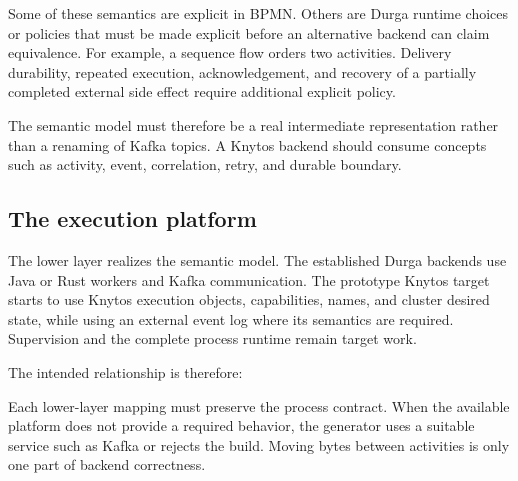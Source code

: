 Some of these semantics are explicit in BPMN. Others are Durga runtime choices
or policies that must be made explicit before an alternative backend can claim
equivalence. For example, a sequence flow orders two activities. Delivery
durability, repeated execution, acknowledgement, and recovery of a partially
completed external side effect require additional explicit policy.

The semantic model must therefore be a real intermediate representation rather
than a renaming of Kafka topics. A Knytos backend should consume concepts
such as activity, event, correlation, retry, and durable boundary.

\subsection{The execution platform}

The lower layer realizes the semantic model. The established Durga backends use
Java or Rust workers and Kafka communication. The prototype Knytos target
starts to use Knytos execution objects, capabilities, names, and cluster
desired state, while using an external event log where its semantics are
required. Supervision and the complete process runtime remain target work.

The intended relationship is therefore:

\begin{center}
\end{center}

Each lower-layer mapping must preserve the process contract. When the available
platform does not provide a required behavior, the generator uses a suitable service
such as Kafka or rejects the build. Moving bytes between activities is only one
part of backend correctness.

